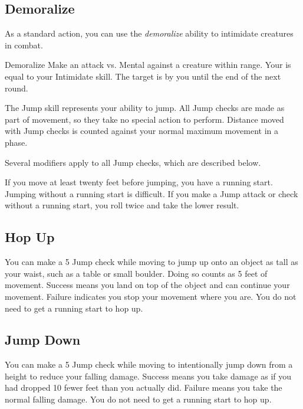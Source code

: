     \subsection{Demoralize}\label{Demoralize}

        As a standard action, you can use the \textit{demoralize} ability to intimidate creatures in combat.

        \begin{freeability}{Demoralize}
            Make an attack vs. Mental against a creature within \rngmed range.
            Your  is equal to your Intimidate skill.
            \hit The target is \shaken by you until the end of the next round.
        \end{freeability}

\newpage
{}
        The Jump skill represents your ability to jump. All Jump checks are made as part of movement, so they take no special action to perform. Distance moved with Jump checks is counted against your normal maximum movement in a phase.

        Several modifiers apply to all Jump checks, which are described below.

        \label{Running Start} If you move at least twenty feet before jumping, you have a running start.
        Jumping without a running start is difficult.
        If you make a Jump attack or check without a running start, you roll twice and take the lower result.

    \subsection{Hop Up}
        You can make a  5 Jump check while moving to jump up onto an object as tall as your waist, such as a table or small boulder. Doing so counts as 5 feet of movement. Success means you land on top of the object and can continue your movement. Failure indicates you stop your movement where you are. You do not need to get a running start to hop up.

    \subsection{Jump Down}
        You can make a  5 Jump check while moving to intentionally jump down from a height to reduce your falling damage. Success means you take damage as if you had dropped 10 fewer feet than you actually did. Failure means you take the normal falling damage. You do not need to get a running start to hop up.

